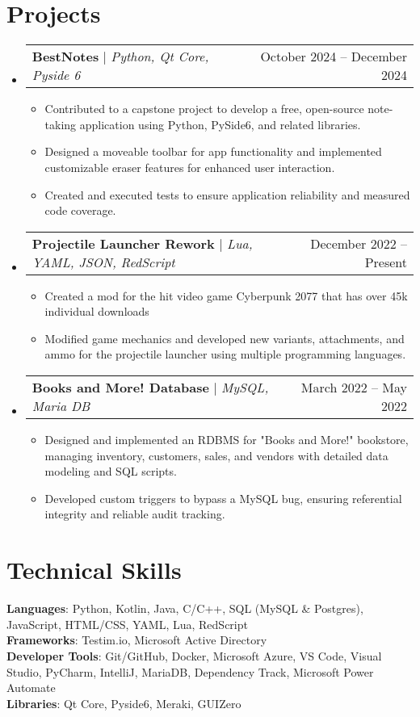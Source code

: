\documentclass[letterpaper,11pt]{article}
\makeatletter
\newcommand{\resumeItem}[1]{
  \item\small{
    {#1 \vspace{-2pt}}
  }
}
\newcommand{\resumeProjectHeading}[2]{
    \item
    \begin{tabular*}{0.97\textwidth}{l@{\extracolsep{\fill}}r}
      \small#1 & #2 \\
    \end{tabular*}\vspace{-7pt}
}
\newcommand{\resumeSubHeadingListStart}{\begin{itemize}[leftmargin=0.15in, label={}]}
\newcommand{\resumeSubHeadingListEnd}{\end{itemize}}
\newcommand{\resumeItemListStart}{\begin{itemize}}
\newcommand{\resumeItemListEnd}{\end{itemize}\vspace{-5pt}}
\makeatother
\begin{document}
\section{Projects}
    \resumeSubHeadingListStart
      \resumeProjectHeading
          {\textbf{BestNotes} $|$ \emph{Python, Qt Core, Pyside 6}}{October 2024 -- December 2024}
          \resumeItemListStart
            \resumeItem{Contributed to a capstone project to develop a free, open-source note-taking application using Python, PySide6, and related libraries.}
            \resumeItem{Designed a moveable toolbar for app functionality and implemented customizable eraser features for enhanced user interaction.}
            \resumeItem{Created and executed tests to ensure application reliability and measured code coverage.}
          \resumeItemListEnd
      \resumeProjectHeading
          {\textbf{Projectile Launcher Rework} $|$ \emph{Lua, YAML, JSON, RedScript}}{December 2022 -- Present}
          \resumeItemListStart
            \resumeItem{Created a mod for the hit video game Cyberpunk 2077 that has over 45k individual downloads}
            \resumeItem{Modified game mechanics and developed new variants, attachments, and ammo for the projectile launcher using multiple programming languages.}
          \resumeItemListEnd
      \resumeProjectHeading
          {\textbf{Books and More! Database} $|$ \emph{MySQL, Maria DB}}{March 2022 -- May 2022}
          \resumeItemListStart
            \resumeItem{Designed and implemented an RDBMS for "Books and More!" bookstore, managing inventory, customers, sales, and vendors with detailed data modeling and SQL scripts.}
            \resumeItem{Developed custom triggers to bypass a MySQL bug, ensuring referential integrity and reliable audit tracking.}
          \resumeItemListEnd
    \resumeSubHeadingListEnd



%
\section{Technical Skills}
 \begin{itemize}[leftmargin=0.15in, label={}]
    \small{\item{
     \textbf{Languages}{: Python, Kotlin, Java, C/C++, SQL (MySQL \& Postgres), JavaScript, HTML/CSS, YAML, Lua, RedScript} \\
     \textbf{Frameworks}{: Testim.io, Microsoft Active Directory} \\
     \textbf{Developer Tools}{: Git/GitHub, Docker, Microsoft Azure, VS Code, Visual Studio, PyCharm, IntelliJ, MariaDB, Dependency Track, Microsoft Power Automate} \\
     \textbf{Libraries}{: Qt Core, Pyside6, Meraki, GUIZero}
    }}
 \end{itemize}


\end{document}
